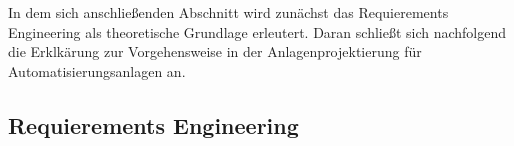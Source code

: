 \documentclass[../Bachelorarbeit.tex]{subfiles}
\begin{document}
In dem sich anschließenden Abschnitt wird zunächst das Requierements Engineering als theoretische Grundlage erleutert. Daran schließt sich nachfolgend die Erklkärung zur Vorgehensweise in der Anlagenprojektierung für Automatisierungsanlagen an. %

\subsection{Requierements Engineering}
\blindtext[1]
\end{document}
